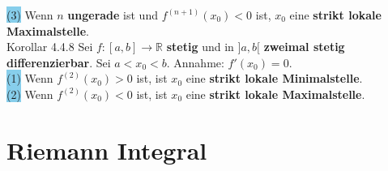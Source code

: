 \documentclass[landscape, 10pt]{article}
\newcommand{\R}{\mathbb{R}}
\begin{document}
\begin{multicols}{3}
                     \colorbox{SkyBlue}{(3)} Wenn \textcolor{NavyBlue}{$n$} 
                            \textbf{ungerade} 
                            ist und \textcolor{NavyBlue}{$f^{(n+1)}(x_0)<0$} ist,
                            \textcolor{NavyBlue}{$x_0$} eine 
                            \textbf{strikt lokale Maximalstelle}. \\
              \colorbox{BurntOrange}{Korollar 4.4.8} 
                     Sei \textcolor{NavyBlue}{$f:[a,b]\longrightarrow\R$} 
                     \textbf{stetig} und in \textcolor{NavyBlue}{$]a,b[$}
                     \textbf{zweimal stetig differenzierbar}. Sei 
                     \textcolor{NavyBlue}{$a<x_0<b$}. 
                     Annahme: \textcolor{NavyBlue}{$f'(x_0)=0$}.\\
                     \colorbox{SkyBlue}{(1)} Wenn 
                            \textcolor{NavyBlue}{$f^{(2)}(x_0)>0$} ist, ist 
                            \textcolor{NavyBlue}{$x_0$}
                            eine \textbf{strikt lokale Minimalstelle}. \\
                     \colorbox{SkyBlue}{(2)} Wenn 
                            \textcolor{NavyBlue}{$f^{(2)}(x_0)<0$} ist, ist
                            \textcolor{NavyBlue}{$x_0$}
                            eine \textbf{strikt lokale Maximalstelle}.

\section{Riemann Integral}

\end{multicols}
\end{document}
